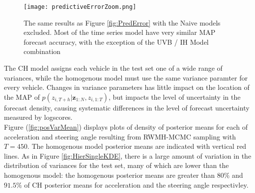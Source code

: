 \documentclass[12pt,a4paper]{article}\usepackage[]{graphicx}\usepackage[]{color}
\begin{document}
{\begin{figure}[ht]
\centering
\texttt{[image: predictiveErrorZoom.png]}
\caption{The same results as Figure \ref{fig:PredError} with the Naive models excluded. Most of the time series model have very similar MAP forecast accuracy, with the exception of the UVB / IH Model combination}
\label{fig:PredErrorZ}
\end{figure}

\begin{table}[ht]
\centering
{}
\caption{Mean forecast Euclidean error in metres for the the best Naive model, Naive 8, and each time series model at a forecast horizon of one second, two seconds and three seconds. Each time series model performs significantly better than Naive 8, and are very competitive with each other. The use of UVB for the IH model appears to have increased the forecast error relative to MCMC and VB inference for this model.}
\label{table:meanError}
\end{table}

The CH model assigns each vehicle in the test set one of a wide range of variances, while the homogenous model must use the same variance paramter for every vehicle. Changes in variance parameters has little impact on the location of the MAP of $p(z_{i, T+h} | \textbf{z}_{1:N}, z_{i, 1:T})$, but impacts the level of uncertainty in the forecast density, causing systematic differences in the level of forecast uncertainty measured by logscores.
\\
Figure (\ref{fig:posVarMean}) displays plots of density of posterior means for each of acceleration and steering angle resulting from RWMH-MCMC sampling with $T = 450$. The homogenous model posterior means are indicated with vertical red lines. As in Figure \ref{fig:HierSingleKDE}, there is a large amount of variation in the distribution of variances for the test set, many of which are lower than the homogenous model: the homogenous posterior means are greater than $80\%$ and $91.5\%$ of CH posterior means for acceleration and the steering angle respectivley. 
\\

}
\end{document}
